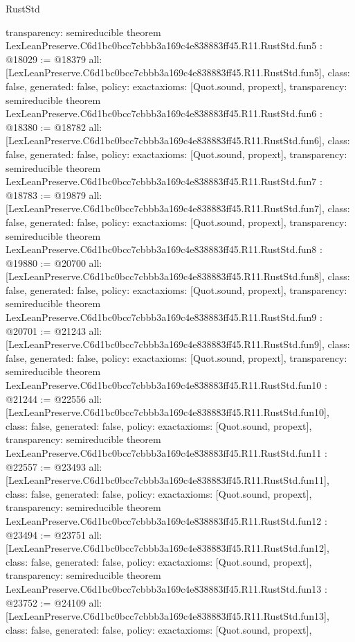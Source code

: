 \begin{lexlean}{RustStd}
\begin{coremodule}
{  transparency: semireducible
}
theorem LexLeanPreserve.C6d1bc0bcc7cbbb3a169c4e838883ff45.R11.RustStd.fun5 : @18029 := @18379 {
  all: [LexLeanPreserve.C6d1bc0bcc7cbbb3a169c4e838883ff45.R11.RustStd.fun5],
  class: false,
  generated: false,
  policy: exact{axioms: [Quot.sound, propext]},
  transparency: semireducible
}
theorem LexLeanPreserve.C6d1bc0bcc7cbbb3a169c4e838883ff45.R11.RustStd.fun6 : @18380 := @18782 {
  all: [LexLeanPreserve.C6d1bc0bcc7cbbb3a169c4e838883ff45.R11.RustStd.fun6],
  class: false,
  generated: false,
  policy: exact{axioms: [Quot.sound, propext]},
  transparency: semireducible
}
theorem LexLeanPreserve.C6d1bc0bcc7cbbb3a169c4e838883ff45.R11.RustStd.fun7 : @18783 := @19879 {
  all: [LexLeanPreserve.C6d1bc0bcc7cbbb3a169c4e838883ff45.R11.RustStd.fun7],
  class: false,
  generated: false,
  policy: exact{axioms: [Quot.sound, propext]},
  transparency: semireducible
}
theorem LexLeanPreserve.C6d1bc0bcc7cbbb3a169c4e838883ff45.R11.RustStd.fun8 : @19880 := @20700 {
  all: [LexLeanPreserve.C6d1bc0bcc7cbbb3a169c4e838883ff45.R11.RustStd.fun8],
  class: false,
  generated: false,
  policy: exact{axioms: [Quot.sound, propext]},
  transparency: semireducible
}
theorem LexLeanPreserve.C6d1bc0bcc7cbbb3a169c4e838883ff45.R11.RustStd.fun9 : @20701 := @21243 {
  all: [LexLeanPreserve.C6d1bc0bcc7cbbb3a169c4e838883ff45.R11.RustStd.fun9],
  class: false,
  generated: false,
  policy: exact{axioms: [Quot.sound, propext]},
  transparency: semireducible
}
theorem LexLeanPreserve.C6d1bc0bcc7cbbb3a169c4e838883ff45.R11.RustStd.fun10 : @21244 := @22556 {
  all: [LexLeanPreserve.C6d1bc0bcc7cbbb3a169c4e838883ff45.R11.RustStd.fun10],
  class: false,
  generated: false,
  policy: exact{axioms: [Quot.sound, propext]},
  transparency: semireducible
}
theorem LexLeanPreserve.C6d1bc0bcc7cbbb3a169c4e838883ff45.R11.RustStd.fun11 : @22557 := @23493 {
  all: [LexLeanPreserve.C6d1bc0bcc7cbbb3a169c4e838883ff45.R11.RustStd.fun11],
  class: false,
  generated: false,
  policy: exact{axioms: [Quot.sound, propext]},
  transparency: semireducible
}
theorem LexLeanPreserve.C6d1bc0bcc7cbbb3a169c4e838883ff45.R11.RustStd.fun12 : @23494 := @23751 {
  all: [LexLeanPreserve.C6d1bc0bcc7cbbb3a169c4e838883ff45.R11.RustStd.fun12],
  class: false,
  generated: false,
  policy: exact{axioms: [Quot.sound, propext]},
  transparency: semireducible
}
theorem LexLeanPreserve.C6d1bc0bcc7cbbb3a169c4e838883ff45.R11.RustStd.fun13 : @23752 := @24109 {
  all: [LexLeanPreserve.C6d1bc0bcc7cbbb3a169c4e838883ff45.R11.RustStd.fun13],
  class: false,
  generated: false,
  policy: exact{axioms: [Quot.sound, propext]},
}
\end{coremodule}
\end{lexlean}
